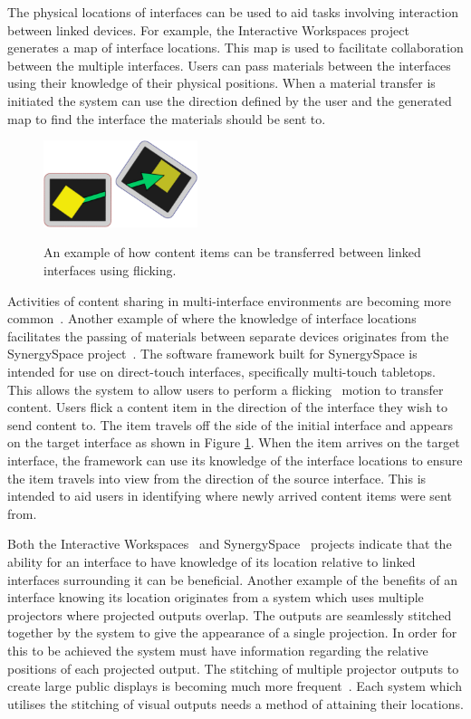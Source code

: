 \documentclass{bmcart}
\begin{document}
The physical locations of interfaces can be used to aid tasks involving interaction between linked devices.
For example, the Interactive Workspaces project~\cite{Johanson2002} generates a map of interface locations.
This map is used to facilitate collaboration between the multiple interfaces.
Users can pass materials between the interfaces using their knowledge of their physical positions.
When a material transfer is initiated the system can use the direction defined by the user and the generated map to find the interface the materials should be sent to.

\begin{figure}[h!]
   \centering
   \caption{An example of how content items can be transferred between linked interfaces using flicking.}
   \includegraphics[width=0.4\textwidth]{figures/flicking.png}
   \label{fig:flick}
\end{figure}

Activities of content sharing in multi-interface environments are becoming more common~\cite{Nacenta2009}.
Another example of where the knowledge of interface locations facilitates the passing of materials between separate devices originates from the SynergySpace project~\cite{Burd2009}.
The software framework built for SynergySpace is intended for use on direct-touch interfaces, specifically multi-touch tabletops.
This allows the system to allow users to perform a flicking~\cite{Reetz2006} motion to transfer content.
Users flick a content item in the direction of the interface they wish to send content to.
The item travels off the side of the initial interface and appears on the target interface as shown in Figure \ref{fig:flick}.
When the item arrives on the target interface, the framework can use its knowledge of the interface locations to ensure the item travels into view from the direction of the source interface.
This is intended to aid users in identifying where newly arrived content items were sent from.

Both the Interactive Workspaces~\cite{Johanson2002} and SynergySpace~\cite{Burd2009} projects indicate that the ability for an interface to have knowledge of its location relative to linked interfaces surrounding it can be beneficial.
Another example of the benefits of an interface knowing its location originates from a system which uses multiple projectors where projected outputs overlap.
The outputs are seamlessly stitched together by the system to give the appearance of a single projection.
In order for this to be achieved the system must have information regarding the relative positions of each projected output.
The stitching of multiple projector outputs to create large public displays is becoming much more frequent~\cite{Jones2011}.
Each system which utilises the stitching of visual outputs needs a method of attaining their locations.
\end{document}
